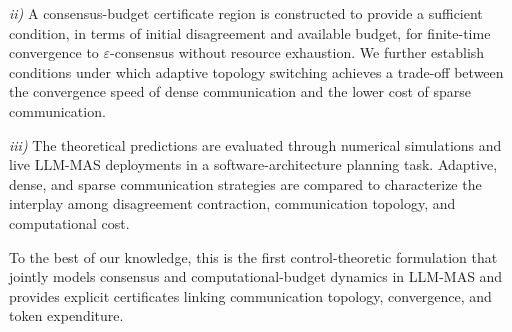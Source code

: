 \documentclass[journal,twoside,web]{ieeecolor_no_firstpage_logo}
\begin{document}
\textit{ii)} A consensus-budget certificate region is constructed to provide a sufficient condition, in terms of initial disagreement and available budget, for finite-time convergence to $\varepsilon$-consensus without resource exhaustion. We further establish conditions under which adaptive topology switching achieves a trade-off between the convergence speed of dense communication and the lower cost of sparse communication.

\textit{iii)} The theoretical predictions are evaluated through numerical simulations and live LLM-MAS deployments in a software-architecture planning task. Adaptive, dense, and sparse communication strategies are compared to characterize the interplay among disagreement contraction, communication topology, and computational cost.

To the best of our knowledge, this is the first control-theoretic formulation that jointly models consensus and computational-budget dynamics in LLM-MAS and provides explicit certificates linking communication topology, convergence, and token expenditure.






\end{document}
